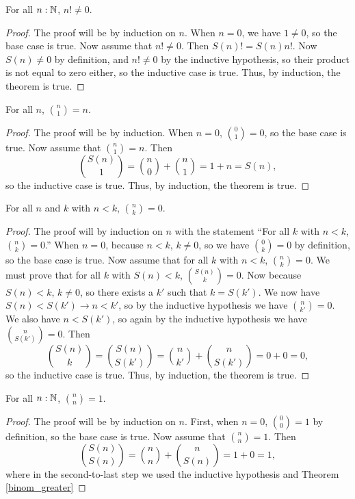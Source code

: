 \documentclass[../math.tex]{subfiles}
\begin{document}
\begin{theorem} \label{factorial_nz}
    For all $n : \mathbb{N}$, $n! \neq 0$.
\end{theorem}
\begin{proof}
    The proof will be by induction on $n$.  When $n = 0$, we have $1 \neq 0$, so
    the base case is true.  Now assume that $n! \neq 0$.  Then $S(n)! = S(n)
    n!$.  Now $S(n) \neq 0$ by definition, and $n! \neq 0$ by the inductive
    hypothesis, so their product is not equal to zero either, so the inductive
    case is true.  Thus, by induction, the theorem is true.
\end{proof}

\begin{theorem}
    For all $n$, $\displaystyle \binom{n}{1} = n$.
\end{theorem}
\begin{proof}
    The proof will be by induction.  When $n = 0$, $\binom{0}{1} = 0$, so the
    base case is true.  Now assume that $\binom{n}{1} = n$.  Then
    \[
        \binom{S(n)}{1} = \binom{n}{0} + \binom{n}{1} = 1 + n = S(n),
    \]
    so the inductive case is true.  Thus, by induction, the theorem is true.
\end{proof}

\begin{theorem} \label{binom_greater}
    For all $n$ and $k$ with $n < k$, $\displaystyle \binom{n}{k} = 0$.
\end{theorem}
\begin{proof}
    The proof will by induction on $n$ with the statement ``For all $k$ with $n
    < k$, $\binom{n}{k} = 0$.''  When $n = 0$, because $n < k$, $k \neq 0$, so
    we have $\binom{0}{k} = 0$ by definition, so the base case is true.  Now
    assume that for all $k$ with $n < k$, $\binom{n}{k} = 0$.  We must prove
    that for all $k$ with $S(n) < k$, $\binom{S(n)}{k} = 0$.  Now because $S(n)
    < k$, $k \neq 0$, so there exists a $k'$ such that $k = S(k')$.  We now have
    $S(n) < S(k') \rightarrow n < k'$, so by the inductive hypothesis we have
    $\binom{n}{k'} = 0$.  We also have $n < S(k')$, so again by the inductive
    hypothesis we have $\binom{n}{S(k')} = 0$.  Then
    \[
        \binom{S(n)}{k} = \binom{S(n)}{S(k')} = \binom{n}{k'} + \binom{n}{S(k')}
        = 0 + 0 = 0,
    \]
    so the inductive case is true.  Thus, by induction, the theorem is true.
\end{proof}

\begin{theorem}
    For all $n : \mathbb{N}$, $\displaystyle \binom{n}{n} = 1$.
\end{theorem}
\begin{proof}
    The proof will be by induction on $n$.  First, when $n = 0$, $\binom{0}{0} =
    1$ by definition, so the base case is true.  Now assume that $\binom{n}{n} =
    1$.  Then
    \[
        \binom{S(n)}{S(n)} = \binom{n}{n} + \binom{n}{S(n)} = 1 + 0 = 1,
    \]
    where in the second-to-last step we used the inductive hypothesis and
    Theorem \ref{binom_greater}
\end{proof}
\end{document}
